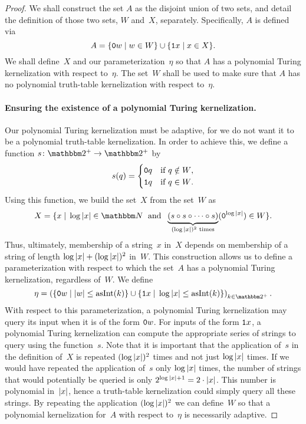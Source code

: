 \begin{proof}
  We shall construct the set $A$ as the disjoint union of two sets, and detail the definition of those two sets, $W$ and~$X$, separately.
  Specifically, $A$ is defined via
  \begin{equation*}
    A = \{\textnormal{\texttt{0}}w \;|\; w \in W\} \cup \{\textnormal{\texttt{1}}x \;|\; x \in X\}.
  \end{equation*}
  We shall define~$X$ and our parameterization~$\eta$ so that $A$ has a polynomial Turing kernelization with respect to~$\eta$.
  The set~$W$ shall be used to make sure that $A$ has no polynomial truth-table kernelization with respect to~$\eta$.

  \paragraph{Ensuring the existence of a polynomial Turing kernelization.}
  Our polynomial Turing kernelization must be adaptive, for we do not want it to be a polynomial truth-table kernelization.
  In order to achieve this, we define a function $s\colon \binary^+ \to \binary^+$ by
  \begin{equation*}
    s(q) = \begin{cases}
      \textnormal{\texttt{0}}q	& \text{if $q \notin W$}, \\
      \textnormal{\texttt{1}}q	& \text{if $q \in W$}.
    \end{cases}
  \end{equation*}
  Using this function, we build the set~$X$ from the set~$W$ as
  \begin{equation*}
    X \deq \{x \st \log\length{x} \in \bbN \reland \underbrace{(s \circ s \circ \cdots \circ s)}_{(\log\length{x})^2\text{ times}}(\bits{0}^{\log\length{x}}) \in W\}.
  \end{equation*}
  Thus, ultimately, membership of a string~$x$ in~$X$ depends on membership of a string of length $\log{\lvert x\rvert} + (\log{\lvert x\rvert})^2$ in~$W$.
  This construction allows us to define a parameterization with respect to which the set~$A$ has a polynomial Turing kernelization, regardless of~$W$.
  We define
  \begin{equation*}
    \eta \deq \left(\{\bits{0}w \st \length{w} \le \asNat(k)\} \cup \{\bits{1}x \st \log\length{x} \le \asNat(k)\}\right)_{k \in \binary^+}.
  \end{equation*}
  With respect to this parameterization, a polynomial Turing kernelization may query its input when it is of the form $\textnormal{\texttt{0}}w$.
  For inputs of the form $\textnormal{\texttt{1}}x$, a polynomial Turing kernelization can compute the appropriate series of strings to query using the function~$s$.
  Note that it is important that the application of~$s$ in the definition of~$X$ is repeated $(\log{\lvert x\rvert})^2$ times and not just $\log{\lvert x\rvert}$ times.
  If we would have repeated the application of~$s$ only $\log{\lvert x\rvert}$ times, the number of strings that would potentially be queried is only $2^{\log{\lvert x\rvert} + 1} = 2 \cdot {\lvert x\rvert}$.
  This number is polynomial in~${\lvert x\rvert}$, hence a truth-table kernelization could simply query all these strings.
  By repeating the application $(\log{\lvert x\rvert})^2$ we can define~$W$ so that a polynomial kernelization for~$A$ with respect to~$\eta$ is necessarily adaptive.


\end{proof}
